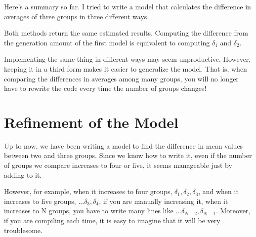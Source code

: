 \documentclass{ltjsbook}
\begin{document}
Here's a summary so far. I tried to write a model that calculates the difference in averages of three groups in three different ways.

Both methods return the same estimated results. Computing the difference from the generation amount of the first model is equivalent to computing $\delta_1$ and $\delta_2$.

Implementing the same thing in different ways may seem unproductive. However, keeping it in a third form makes it easier to generalize the model.
That is, when comparing the differences in averages among many groups, you will no longer have to rewrite the code every time the number of groups changes!
\section{Refinement of the Model}
Up to now, we have been writing a model to find the difference in mean values between two and three groups. Since we know how to write it, even if the number of groups we compare increases to four or five, it seems manageable just by adding to it.

However, for example, when it increases to four groups, $\delta_1,\delta_2,\delta_3$, and when it increases to five groups, $...\delta_3,\delta_4$, if you are manually increasing it, when it increases to N groups, you have to write many lines like $...\delta_{N-2},\delta_{N-1}$. Moreover, if you are compiling each time, it is easy to imagine that it will be very troublesome.
\end{document}
